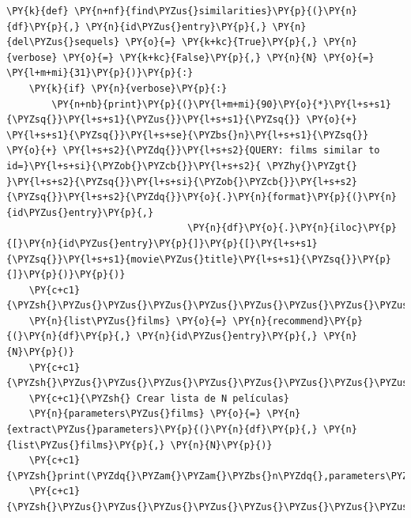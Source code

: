     \begin{tcolorbox}[breakable, size=fbox, boxrule=1pt, pad at break*=1mm,colback=cellbackground, colframe=cellborder]
\begin{Verbatim}[commandchars=\\\{\}]
\PY{k}{def} \PY{n+nf}{find\PYZus{}similarities}\PY{p}{(}\PY{n}{df}\PY{p}{,} \PY{n}{id\PYZus{}entry}\PY{p}{,} \PY{n}{del\PYZus{}sequels} \PY{o}{=} \PY{k+kc}{True}\PY{p}{,} \PY{n}{verbose} \PY{o}{=} \PY{k+kc}{False}\PY{p}{,} \PY{n}{N} \PY{o}{=} \PY{l+m+mi}{31}\PY{p}{)}\PY{p}{:}    
    \PY{k}{if} \PY{n}{verbose}\PY{p}{:} 
        \PY{n+nb}{print}\PY{p}{(}\PY{l+m+mi}{90}\PY{o}{*}\PY{l+s+s1}{\PYZsq{}}\PY{l+s+s1}{\PYZus{}}\PY{l+s+s1}{\PYZsq{}} \PY{o}{+} \PY{l+s+s1}{\PYZsq{}}\PY{l+s+se}{\PYZbs{}n}\PY{l+s+s1}{\PYZsq{}} \PY{o}{+} \PY{l+s+s2}{\PYZdq{}}\PY{l+s+s2}{QUERY: films similar to id=}\PY{l+s+si}{\PYZob{}\PYZcb{}}\PY{l+s+s2}{ \PYZhy{}\PYZgt{} }\PY{l+s+s2}{\PYZsq{}}\PY{l+s+si}{\PYZob{}\PYZcb{}}\PY{l+s+s2}{\PYZsq{}}\PY{l+s+s2}{\PYZdq{}}\PY{o}{.}\PY{n}{format}\PY{p}{(}\PY{n}{id\PYZus{}entry}\PY{p}{,}
                                \PY{n}{df}\PY{o}{.}\PY{n}{iloc}\PY{p}{[}\PY{n}{id\PYZus{}entry}\PY{p}{]}\PY{p}{[}\PY{l+s+s1}{\PYZsq{}}\PY{l+s+s1}{movie\PYZus{}title}\PY{l+s+s1}{\PYZsq{}}\PY{p}{]}\PY{p}{)}\PY{p}{)}
    \PY{c+c1}{\PYZsh{}\PYZus{}\PYZus{}\PYZus{}\PYZus{}\PYZus{}\PYZus{}\PYZus{}\PYZus{}\PYZus{}\PYZus{}\PYZus{}\PYZus{}\PYZus{}\PYZus{}\PYZus{}\PYZus{}\PYZus{}\PYZus{}\PYZus{}\PYZus{}\PYZus{}\PYZus{}\PYZus{}\PYZus{}\PYZus{}\PYZus{}\PYZus{}\PYZus{}\PYZus{}\PYZus{}\PYZus{}\PYZus{}\PYZus{}\PYZus{}\PYZus{}\PYZus{}}
    \PY{n}{list\PYZus{}films} \PY{o}{=} \PY{n}{recommend}\PY{p}{(}\PY{n}{df}\PY{p}{,} \PY{n}{id\PYZus{}entry}\PY{p}{,} \PY{n}{N}\PY{p}{)}
    \PY{c+c1}{\PYZsh{}\PYZus{}\PYZus{}\PYZus{}\PYZus{}\PYZus{}\PYZus{}\PYZus{}\PYZus{}\PYZus{}\PYZus{}\PYZus{}\PYZus{}\PYZus{}\PYZus{}\PYZus{}\PYZus{}\PYZus{}\PYZus{}\PYZus{}\PYZus{}\PYZus{}\PYZus{}\PYZus{}\PYZus{}\PYZus{}\PYZus{}\PYZus{}\PYZus{}\PYZus{}\PYZus{}\PYZus{}\PYZus{}\PYZus{}\PYZus{}}
    \PY{c+c1}{\PYZsh{} Crear lista de N películas}
    \PY{n}{parameters\PYZus{}films} \PY{o}{=} \PY{n}{extract\PYZus{}parameters}\PY{p}{(}\PY{n}{df}\PY{p}{,} \PY{n}{list\PYZus{}films}\PY{p}{,} \PY{n}{N}\PY{p}{)}
    \PY{c+c1}{\PYZsh{}print(\PYZdq{}\PYZam{}\PYZam{}\PYZbs{}n\PYZdq{},parameters\PYZus{}films)}
    \PY{c+c1}{\PYZsh{}\PYZus{}\PYZus{}\PYZus{}\PYZus{}\PYZus{}\PYZus{}\PYZus{}\PYZus{}\PYZus{}\PYZus{}\PYZus{}\PYZus{}\PYZus{}\PYZus{}\PYZus{}\PYZus{}\PYZus{}\PYZus{}\PYZus{}\PYZus{}\PYZus{}\PYZus{}\PYZus{}\PYZus{}\PYZus{}\PYZus{}\PYZus{}\PYZus{}\PYZus{}\PYZus{}\PYZus{}\PYZus{}\PYZus{}\PYZus{}\PYZus{}\PYZus{}\PYZus{}\PYZus{}\PYZus{}}

\end{Verbatim}
\end{tcolorbox}
